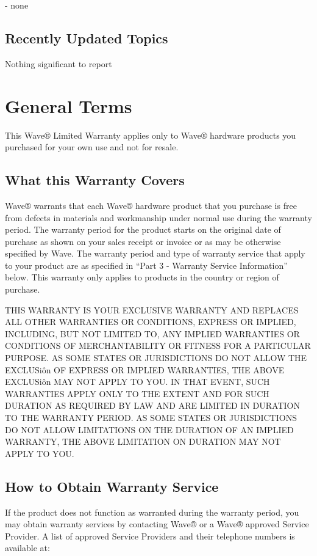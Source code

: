 \documentclass[letterpaper,10pt,openany,oneside,english]{sphinxmanual}
\begin{document}
 - none


\subsection{Recently Updated Topics}
\label{\detokenize{releasenotes:recently-updated-topics}}
Nothing significant to report


\section{General Terms}
\label{\detokenize{part1:general-terms}}\label{\detokenize{part1::doc}}
This Wave® Limited Warranty applies only to Wave® hardware products you purchased for your own use and not for resale.


\subsection{What this Warranty Covers}
\label{\detokenize{part1:what-this-warranty-covers}}
Wave® warrants that each Wave® hardware product that you purchase is free from defects in materials and workmanship under normal use during the warranty period. The warranty period for the product starts on the original date of purchase as shown on your sales receipt or invoice or as may be otherwise specified by Wave. The warranty period and type of warranty service that apply to your product are as specified in “Part 3 - Warranty Service Information” below. This warranty only applies to products in the country or region of purchase.

THIS WARRANTY IS YOUR EXCLUSIVE WARRANTY AND REPLACES ALL OTHER WARRANTIES OR CONDITIONS, EXPRESS OR IMPLIED, INCLUDING, BUT NOT LIMITED TO, ANY IMPLIED WARRANTIES OR CONDITIONS OF MERCHANTABILITY OR FITNESS FOR A PARTICULAR PURPOSE. AS SOME STATES OR JURISDICTIONS DO NOT ALLOW THE EXCLUSiôn OF EXPRESS OR IMPLIED WARRANTIES, THE ABOVE EXCLUSiôn MAY NOT APPLY TO YOU. IN THAT EVENT, SUCH WARRANTIES APPLY ONLY TO THE EXTENT AND FOR SUCH DURATION AS REQUIRED BY LAW AND ARE LIMITED IN DURATION TO THE WARRANTY PERIOD. AS SOME STATES OR JURISDICTIONS DO NOT ALLOW LIMITATIONS ON THE DURATION OF AN IMPLIED WARRANTY, THE ABOVE LIMITATION ON DURATION MAY NOT APPLY TO YOU.


\subsection{How to Obtain Warranty Service}
\label{\detokenize{part1:how-to-obtain-warranty-service}}
If the product does not function as warranted during the warranty period, you may obtain warranty services by contacting Wave® or a Wave® approved Service Provider. A list of approved Service Providers and their telephone numbers is available at: 
\end{document}
